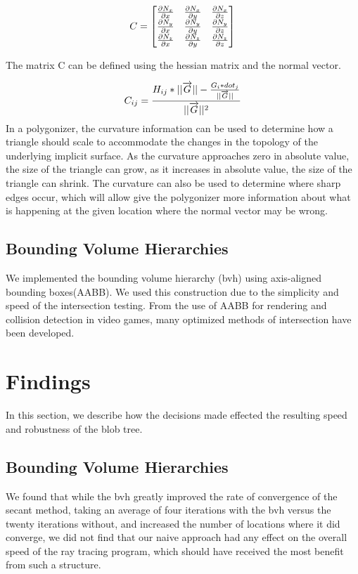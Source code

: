 \documentclass[conference]{acmsiggraph}
\begin{document}
$$
C=
\begin{bmatrix}
	{\partial N_x \over \partial x}&{\partial N_x \over \partial y}&{\partial N_x \over \partial z}\\
	{\partial N_y \over \partial x}&{\partial N_y \over \partial y}&{\partial N_y \over \partial z}\\
	{\partial N_z \over \partial x}&{\partial N_z \over \partial y}&{\partial N_z \over \partial z}
\end{bmatrix}
$$

The matrix C can be defined using the hessian matrix and the normal vector.

$$
C_{ij} = {H_{ij} * ||\overrightarrow{G}|| - {G_i * dot_j \over
	||\overrightarrow{G}||} \over ||\overrightarrow{G}||^2}
$$
In a polygonizer, the curvature information can be used to determine how a
triangle should scale to accommodate the changes in the topology of the
underlying implicit surface. As the curvature approaches zero in absolute value,
the size of the triangle can grow, as it increases in absolute value, the size
of the triangle can shrink. The curvature can also be used to determine where
sharp edges occur, which will allow give the polygonizer more information about
what is happening at the given location where the normal vector may be wrong.

\subsection{Bounding Volume Hierarchies}
We implemented the bounding volume hierarchy (bvh) using axis-aligned bounding
boxes(AABB). We used this construction due to the simplicity and speed of the
intersection testing. From the use of AABB for rendering and collision
detection in video games, many optimized methods of intersection have been
developed\cite{Williams}.


\section{Findings}
In this section, we describe how the decisions made effected the resulting
speed and robustness of the blob tree.

\subsection{Bounding Volume Hierarchies}
We found that while the bvh greatly improved the rate of convergence of the
secant method, taking an average of four iterations with the bvh versus the
twenty iterations without, and increased the number of locations where it did
converge, we did not find that our naive approach had any effect on the overall
speed of the ray tracing program, which should have received the most benefit
from such a structure.
\end{document}
